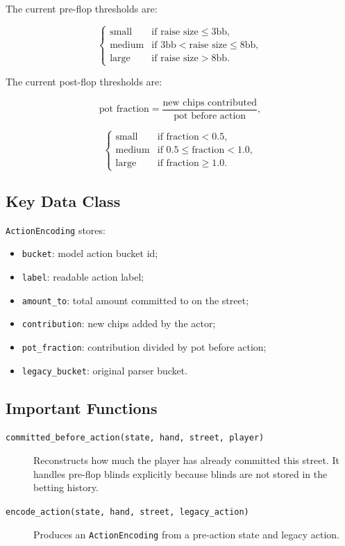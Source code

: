 \documentclass[11pt]{article}
\begin{document}
The current pre-flop thresholds are:

\[
\begin{cases}
\text{small} & \text{if raise size} \leq 3\text{bb},\\
\text{medium} & \text{if } 3\text{bb} < \text{raise size} \leq 8\text{bb},\\
\text{large} & \text{if raise size} > 8\text{bb}.
\end{cases}
\]

The current post-flop thresholds are:

\[
\text{pot fraction}
=
\frac{\text{new chips contributed}}{\text{pot before action}},
\]

\[
\begin{cases}
\text{small} & \text{if fraction} < 0.5,\\
\text{medium} & \text{if } 0.5 \leq \text{fraction} < 1.0,\\
\text{large} & \text{if fraction} \geq 1.0.
\end{cases}
\]

\subsection{Key Data Class}

\texttt{ActionEncoding} stores:

\begin{itemize}[leftmargin=*]
  \item \texttt{bucket}: model action bucket id;
  \item \texttt{label}: readable action label;
  \item \texttt{amount\_to}: total amount committed to on the street;
  \item \texttt{contribution}: new chips added by the actor;
  \item \texttt{pot\_fraction}: contribution divided by pot before action;
  \item \texttt{legacy\_bucket}: original parser bucket.
\end{itemize}

\subsection{Important Functions}

\begin{description}
  \item[\texttt{committed\_before\_action(state, hand, street, player)}]
  Reconstructs how much the player has already committed this street.
  It handles pre-flop blinds explicitly because blinds are not stored in the
  betting history.
  \item[\texttt{encode\_action(state, hand, street, legacy\_action)}]
  Produces an \texttt{ActionEncoding} from a pre-action state and legacy action.
\end{description}
\end{document}
